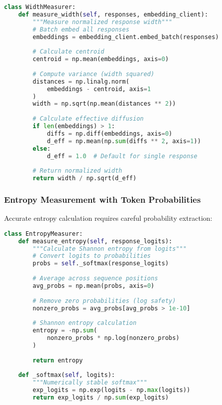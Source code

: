 \documentclass[conference]{IEEEtran}
\begin{document}
\begin{lstlisting}[language=Python, basicstyle=\small]
class WidthMeasurer:
    def measure_width(self, responses, embedding_client):
        """Measure normalized response width"""
        # Batch embed all responses
        embeddings = embedding_client.embed_batch(responses)
        
        # Calculate centroid
        centroid = np.mean(embeddings, axis=0)
        
        # Compute variance (width squared)
        distances = np.linalg.norm(
            embeddings - centroid, axis=1
        )
        width = np.sqrt(np.mean(distances ** 2))
        
        # Calculate effective diffusion
        if len(embeddings) > 1:
            diffs = np.diff(embeddings, axis=0)
            d_eff = np.mean(np.sum(diffs ** 2, axis=1))
        else:
            d_eff = 1.0  # Default for single response
        
        # Return normalized width
        return width / np.sqrt(d_eff)
\end{lstlisting}

\subsubsection{Entropy Measurement with Token Probabilities}

Accurate entropy calculation requires careful probability extraction:

\begin{lstlisting}[language=Python, basicstyle=\small]
class EntropyMeasurer:
    def measure_entropy(self, response_logits):
        """Calculate Shannon entropy from logits"""
        # Convert logits to probabilities
        probs = self._softmax(response_logits)
        
        # Average across sequence positions
        avg_probs = np.mean(probs, axis=0)
        
        # Remove zero probabilities (log safety)
        nonzero_probs = avg_probs[avg_probs > 1e-10]
        
        # Shannon entropy calculation
        entropy = -np.sum(
            nonzero_probs * np.log(nonzero_probs)
        )
        
        return entropy
    
    def _softmax(self, logits):
        """Numerically stable softmax"""
        exp_logits = np.exp(logits - np.max(logits))
        return exp_logits / np.sum(exp_logits)
\end{lstlisting}
\end{document}
